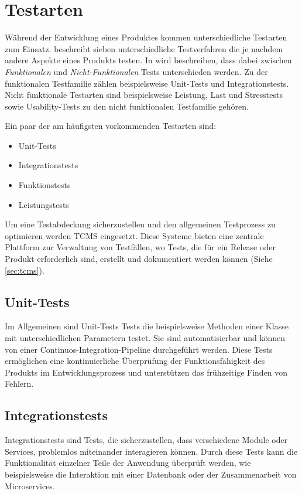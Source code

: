 \documentclass[a4paper, fontsize=11pt, parskip=half, twoside]{scrreprt}
\begin{document}
	\section{Testarten} \label{sec:testtypes}
	Während der Entwicklung eines Produktes kommen unterschiedliche Testarten zum Einsatz. 
	\textcite{atlassian_unterschiedlichen_nodate} beschreibt sieben unterschiedliche Testverfahren die je nachdem andere Aspekte eines Produkts testen.
	In \textcite{noauthor_software_nodate} wird beschreiben, dass dabei zwischen \emph{Funktionalen} und \emph{Nicht-Funktionalen} Tests unterschieden werden.
	Zu der funktionalen Testfamilie zählen beispielsweise Unit-Tests und Integrationstests.
	Nicht funktionale Testarten sind beispielsweise Leistung, Last und Stresstests sowie Usability-Tests zu den nicht funktionalen Testfamilie gehören.
	
	Ein paar der am häufigsten vorkommenden Testarten sind:
	
	\begin{itemize}
		\item Unit-Tests
		\item Integrationstests
		\item Funktionstests
		\item Leistungstests
	\end{itemize}

	Um eine Testabdeckung sicherzustellen und den allgemeinen Testprozess zu optimieren werden \ac{TCMS} eingesetzt. 
	Diese Systeme bieten eine zentrale Plattform zur Verwaltung von Testfällen, wo Tests, die für ein Release oder Produkt erforderlich sind, erstellt und dokumentiert werden können (Siehe \autoref{sec:tcms}). 
	
	\textcite{ammann_introduction_2016}
	
	\subsection{Unit-Tests}
	Im Allgemeinen sind Unit-Tests Tests die beispielsweise Methoden einer Klasse mit unterschiedlichen Parametern testet. 
	Sie sind automatisierbar und können von einer Continuos-Integration-Pipeline durchgeführt werden. 
	Diese Tests ermöglichen eine kontinuierliche Überprüfung der Funktionsfähigkeit des Produkts im Entwicklungsprozess und unterstützen das frühzeitige Finden von Fehlern.
	
	\subsection{Integrationstests}
	Integrationstests sind Tests, die sicherzustellen, dass verschiedene Module oder Services, problemlos miteinander interagieren können. 
	Durch diese Tests kann die Funktionalität einzelner Teile der Anwendung überprüft werden, wie beispielsweise die Interaktion mit einer Datenbank oder der Zusammenarbeit von Microservices.
	
\end{document}

